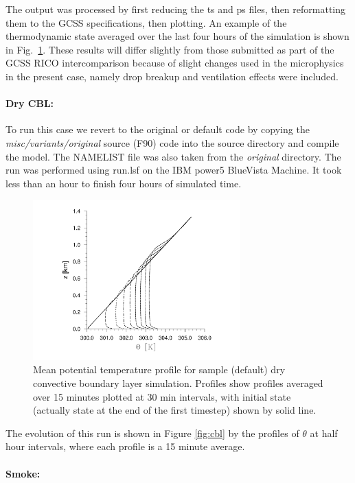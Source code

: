 \documentclass[11pt,a4paper]{article}
\begin{document}
The output was processed by first reducing the ts and ps files, then
reformatting them to the GCSS specifications, then plotting.  An
example of the thermodynamic state averaged over the last four hours
of the simulation is shown in Fig.~\ref{fig:rico}.  These results will
differ slightly from those submitted as part of the GCSS RICO
intercomparison because of slight changes used in the microphysics in
the present case, namely drop breakup and ventilation effects were
included.

\paragraph{Dry CBL:} To run this case we revert to the original or
default code by copying the \emph{misc/variants/original} source (F90)
code into the source directory and compile the model.  The NAMELIST
file was also taken from the \emph{original} directory.  The run was
performed using run.lsf on the IBM power5 BlueVista Machine.  It took
less than an hour to finish four hours of simulated time.

\begin{figure}[htb]
\centering \leavevmode 
\includegraphics[width=8cm]{cbl}
\caption{Mean potential temperature profile for sample (default) dry
convective boundary layer simulation.  Profiles show profiles
averaged over 15 minutes plotted at 30 min intervals, with initial
state (actually state at the end of the first timestep) shown by solid
line.}
\label{fig:rico}
\end{figure}

The evolution of this run is shown in Figure \ref{fig:cbl} by the
profiles of $\theta$ at half hour intervals, where each profile is a
15 minute average.

\paragraph{Smoke:} 
\end{document}
